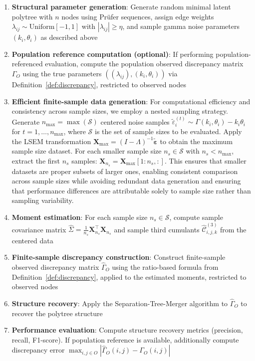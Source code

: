 \documentclass[11pt,a4paper]{article}
\numberwithin{equation}{section}
\begin{document}
\begin{enumerate}[label=\textbf{Step \arabic*:}]
\item \textbf{Structural parameter generation}: Generate random minimal latent polytree with $n$ nodes using Prüfer sequences, assign edge weights $\lambda_{ij} \sim \text{Uniform}[-1,1]$ with $|\lambda_{ij}| \geq \eta$, and sample gamma noise parameters $(k_i, \theta_i)$ as described above

\item \textbf{Population reference computation (optional)}: If performing population-referenced evaluation, compute the population observed discrepancy matrix $\Gamma_O$ using the true parameters $((\lambda_{ij}), (k_i, \theta_i))$ via Definition~\ref{def:discrepancy}, restricted to observed nodes

\item \textbf{Efficient finite-sample data generation}: For computational efficiency and consistency across sample sizes, we employ a nested sampling strategy. Generate $n_{\max} = \max(\mathcal{S})$ centered noise samples $\tilde{\varepsilon}_i^{(t)} \sim \Gamma(k_i, \theta_i) - k_i\theta_i$ for $t = 1, \ldots, n_{\max}$, where $\mathcal{S}$ is the set of sample sizes to be evaluated. Apply the LSEM transformation $\mathbf{X}_{\max} = (I - \Lambda)^{-1}\tilde{\boldsymbol{\varepsilon}}$ to obtain the maximum sample size dataset. For each smaller sample size $n_s \in \mathcal{S}$ with $n_s < n_{\max}$, extract the first $n_s$ samples: $\mathbf{X}_{n_s} = \mathbf{X}_{\max}[1:n_s, :]$. This ensures that smaller datasets are proper subsets of larger ones, enabling consistent comparison across sample sizes while avoiding redundant data generation and ensuring that performance differences are attributable solely to sample size rather than sampling variability.

\item \textbf{Moment estimation}: For each sample size $n_s \in \mathcal{S}$, compute sample covariance matrix $\hat{\Sigma} = \frac{1}{n_s}\mathbf{X}_{n_s}^\top\mathbf{X}_{n_s}$ and sample third cumulants $\hat{\mathcal{C}}^{(3)}_{i,j,k}$ from the centered data

\item \textbf{Finite-sample discrepancy construction}: Construct finite-sample observed discrepancy matrix $\hat{\Gamma}_O$ using the ratio-based formula from Definition~\ref{def:discrepancy}, applied to the estimated moments, restricted to observed nodes

\item \textbf{Structure recovery}: Apply the Separation-Tree-Merger algorithm to $\hat{\Gamma}_O$ to recover the polytree structure

\item \textbf{Performance evaluation}: Compute structure recovery metrics (precision, recall, F1-score). If population reference is available, additionally compute discrepancy error $\max_{i,j \in O}|\hat{\Gamma}_O(i,j) - \Gamma_O(i,j)|$
\end{enumerate}
\end{document}
